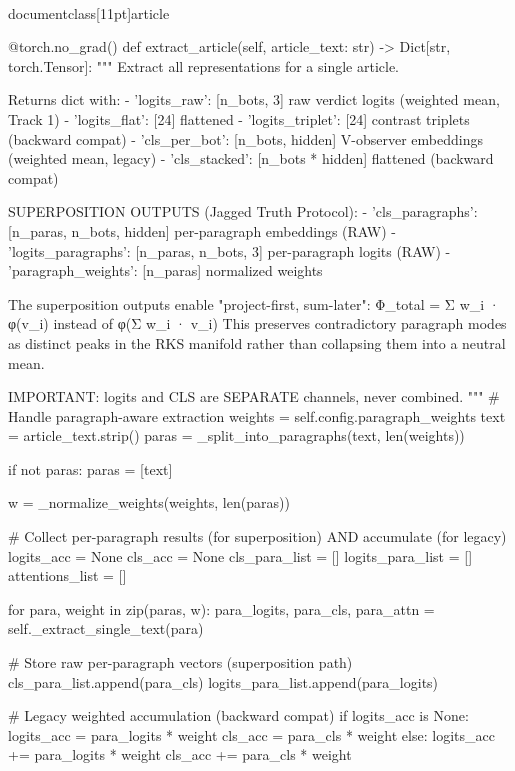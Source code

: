 \\documentclass[11pt]{article}
\begin{document}
\begin{CodeBlock}
    @torch.no_grad()
    def extract_article(self, article_text: str) -> Dict[str, torch.Tensor]:
        """
        Extract all representations for a single article.

        Returns dict with:
        - 'logits_raw': [n_bots, 3] raw verdict logits (weighted mean, Track 1)
        - 'logits_flat': [24] flattened
        - 'logits_triplet': [24] contrast triplets (backward compat)
        - 'cls_per_bot': [n_bots, hidden] V-observer embeddings (weighted mean, legacy)
        - 'cls_stacked': [n_bots * hidden] flattened (backward compat)

        SUPERPOSITION OUTPUTS (Jagged Truth Protocol):
        - 'cls_paragraphs': [n_paras, n_bots, hidden] per-paragraph embeddings (RAW)
        - 'logits_paragraphs': [n_paras, n_bots, 3] per-paragraph logits (RAW)
        - 'paragraph_weights': [n_paras] normalized weights

        The superposition outputs enable "project-first, sum-later":
            Φ_total = Σ w_i · φ(v_i)  instead of  φ(Σ w_i · v_i)
        This preserves contradictory paragraph modes as distinct peaks
        in the RKS manifold rather than collapsing them into a neutral mean.

        IMPORTANT: logits and CLS are SEPARATE channels, never combined.
        """
        # Handle paragraph-aware extraction
        weights = self.config.paragraph_weights
        text = article_text.strip()
        paras = _split_into_paragraphs(text, len(weights))

        if not paras:
            paras = [text]

        w = _normalize_weights(weights, len(paras))

        # Collect per-paragraph results (for superposition) AND accumulate (for legacy)
        logits_acc = None
        cls_acc = None
        cls_para_list = []
        logits_para_list = []
        attentions_list = []

        for para, weight in zip(paras, w):
            para_logits, para_cls, para_attn = self._extract_single_text(para)

            # Store raw per-paragraph vectors (superposition path)
            cls_para_list.append(para_cls)
            logits_para_list.append(para_logits)

            # Legacy weighted accumulation (backward compat)
            if logits_acc is None:
                logits_acc = para_logits * weight
                cls_acc = para_cls * weight
            else:
                logits_acc += para_logits * weight
                cls_acc += para_cls * weight


\end{CodeBlock}
\end{document}
